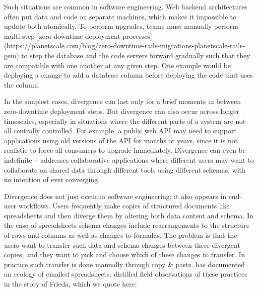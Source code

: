 \documentclass[english,submission]{programming}
\begin{document}
Such situations are common in software engineering. Web backend architectures often put data and code on separate machines, which makes it impossible to update both atomically. To perform upgrades, teams must manually perform multi-step [zero-downtime deployment processes](https://planetscale.com/blog/zero-downtime-rails-migrations-planetscale-rails-gem) to step the database and the code servers forward gradually such that they are compatible with one another at any given step. One example would be deploying a change to add a database column before deploying the code that uses the column.

In the simplest cases, divergence can last only for a brief moments in between zero-downtime deployment steps. But divergence can also occur across longer timescales, especially in situations where the different parts of a system are not all centrally controlled. For example, a public web API may need to support applications using old versions of the API for months or years, since it is not realistic to force all consumers to upgrade immediately. Divergence can even be indefinite -- \citet{Cambria} addresses collaborative applications where different users may want to collaborate on shared data through different tools using different schemas, with no intention of ever converging.

Divergence does not just occur in software engineering; it also appears in end-user workflows. Users frequently make copies of structured documents like spreadsheets and then diverge them by altering both data content and schema. In the case of spreadsheets schema changes include rearrangements to the structure of rows and columns as well as changes to formulas. The problem is that the users want to transfer such data and schema changes between these divergent copies, and they want to pick and choose which of these changes to transfer. In practice such transfer is done manually through copy \& paste. \citet{Basman19} has documented an ecology of emailed spreadsheets. \citet{Burnett14} distilled field observations of these practices in the story of Frieda, which we quote here:
\end{document}
